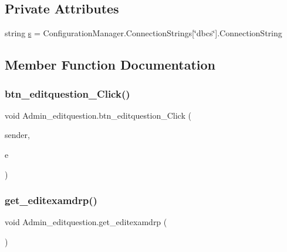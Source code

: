 \subsection*{Private Attributes}
\begin{DoxyCompactItemize}
\item 
string \mbox{\hyperlink{class_admin__editquestion_a8ce5225f9311e77dc1de98748a7f34dd}{s}} = Configuration\+Manager.\+Connection\+Strings\mbox{[}\char`\"{}dbcs\char`\"{}\mbox{]}.Connection\+String
\end{DoxyCompactItemize}


\subsection{Member Function Documentation}
\mbox{\label{class_admin__editquestion_af567b7ee725738bdaaadbf06ad179b30}} 
\subsubsection{\texorpdfstring{btn\_editquestion\_Click()}{btn\_editquestion\_Click()}}
{\footnotesize\ttfamily void Admin\+\_\+editquestion.\+btn\+\_\+editquestion\+\_\+\+Click (\begin{DoxyParamCaption}\item[{object}]{sender,  }\item[{Event\+Args}]{e }\end{DoxyParamCaption})\hspace{0.3cm}{\ttfamily [protected]}}

\mbox{\label{class_admin__editquestion_a2b69c6d5cb940ae6c3261e8dde761984}} 
\subsubsection{\texorpdfstring{get\_editexamdrp()}{get\_editexamdrp()}}
{\footnotesize\ttfamily void Admin\+\_\+editquestion.\+get\+\_\+editexamdrp (\begin{DoxyParamCaption}{ }\end{DoxyParamCaption})}

